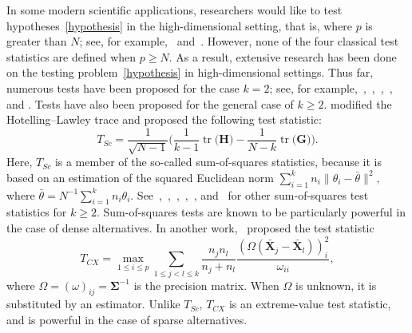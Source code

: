 \documentclass[12pt]{article} %
\DeclareMathOperator{\mytr}{tr}
\newcommand{\bX}{\mathbf{X}}
\newcommand{\bH}{\mathbf{H}}
\newcommand{\bG}{\mathbf{G}}
\newcommand{\bfsym}[1]{\ensuremath{\boldsymbol{#1}}}
\def\bSigma {\bfsym {\Sigma}}
\theoremstyle{definition}
\begin{document}


In some modern scientific applications, researchers would like to test hypotheses~\eqref{hypothesis} in the high-dimensional setting, that is, where $p$ is greater than $N$;
see, for example,~\citet{Verstynen1209} and~\citet{Tsai2009}.
However, none of the four classical test statistics are defined when $p\geq N$.
As a result, extensive research has been done on the testing problem~\eqref{hypothesis} in high-dimensional settings.
 Thus far, numerous tests have been proposed for the case $k=2$;
 see, for example,~\citet{Bai1996Efiect},~\cite{Srivastava2007Multivariate},~\citet{Chen2010A},~\citet{Tony2013}, and \citet{Feng2014Two}.
  Tests have also been proposed for the general case of $k\geq 2$.
 \cite{Schott2007Some} modified the Hotelling--Lawley trace and proposed the following test statistic:
  $$
  T_{Sc}=\frac{1}{\sqrt{N-1}}\Big(
  \frac{1}{k-1}\mytr\big(\bH\big)-\frac{1}{N-k}\mytr\big(\bG\big)
  \Big).
  $$
  Here, $T_{Sc}$ is a member of the so-called sum-of-squares statistics, because it is based on an estimation of the squared Euclidean norm $\sum_{i=1}^k n_i\|\theta_i-\bar{\theta}\|^2$, where $\bar{\theta}=N^{-1}\sum_{i=1}^k n_i \theta_i$.
  See~\cite{Srivastava2013},~\cite{Yamada2015},~\cite{Hu2017},~\cite{ZHANG2017200},~\cite{Chang2017}, and~\cite{2017arXiv171007878C} for other sum-of-squares test statistics for $k\geq 2$.
Sum-of-squares tests are known to be particularly powerful in the case of dense alternatives.
In another work,~\cite{Cai2014High} proposed the test statistic 
  $$
  T_{CX}=\max_{1\leq i\leq p} \sum_{1\leq j<l\leq k}\frac{n_j n_l}{n_j+n_l}\frac{(\Omega(\bar{\bX}_j-\bar{\bX}_l))_i^2}{\omega_{ii}},
  $$
  where $\Omega=(\omega)_{ij}=\bSigma^{-1}$ is the precision matrix. When $\Omega$ is unknown, it is substituted by an estimator.
  Unlike $T_{Sc}$, $T_{CX}$ is an extreme-value test statistic, and is powerful in the case of sparse alternatives.
  
\end{document}
